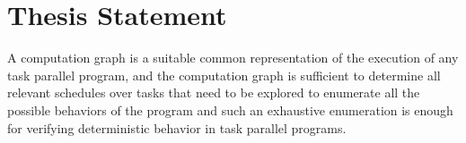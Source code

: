 \section{Thesis Statement}
A computation graph is a suitable common representation of the execution of any task parallel program, and the computation graph is sufficient to determine all relevant schedules over tasks that need to be explored to enumerate all the possible behaviors of the program and such an exhaustive enumeration is enough for verifying deterministic behavior in task parallel programs.
